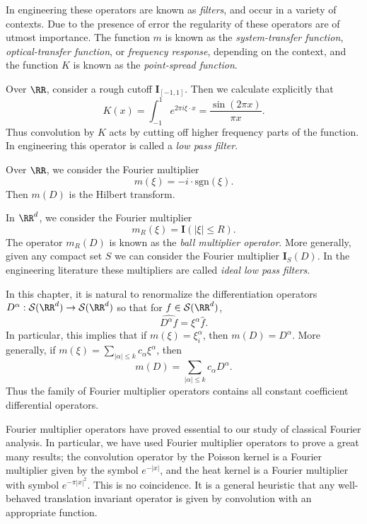 \begin{remark}
  In engineering these operators are known as \emph{filters}, and occur in a variety of contexts. Due to the presence of error the regularity of these operators are of utmost importance. The function $m$ is known as the \emph{system-transfer function}, \emph{optical-transfer function}, or \emph{frequency response}, depending on the context, and the function $K$ is known as the \emph{point-spread function}.
\end{remark}

\begin{example}
  Over $\RR$, consider a rough cutoff $\mathbf{I}_{[-1,1]}$. Then we calculate explicitly that
  \[ K(x) = \int_{-1}^1 e^{2 \pi i \xi \cdot x} = \frac{\sin(2 \pi x)}{\pi x}. \]
  Thus convolution by $K$ acts by cutting off higher frequency parts of the function. In engineering this operator is called a \emph{low pass filter}.
\end{example}

\begin{example}
  Over $\RR$, we consider the Fourier multiplier
  \[ m(\xi) = - i \cdot \text{sgn}(\xi). \]
  Then $m(D)$ is the Hilbert transform.
\end{example}

\begin{example}
  In $\RR^d$, we consider the Fourier multiplier
  \[ m_R(\xi) = \mathbf{I}(|\xi| \leq R). \]
  The operator $m_R(D)$ is known as the \emph{ball multiplier operator}. More generally, given any compact set $S$ we can consider the Fourier multiplier $\mathbf{I}_S(D)$. In the engineering literature these multipliers are called \emph{ideal low pass filters}.
\end{example}

\begin{example}
  In this chapter, it is natural to renormalize the differentiation operators $D^\alpha: \mathcal{S}(\RR^d) \to \mathcal{S}(\RR^d)$ so that for $f \in \mathcal{S}(\RR^d)$,
  \[ \widehat{D^\alpha f} = \xi^\alpha \widehat{f}. \]
  In particular, this implies that if $m(\xi) = \xi_i^\alpha$, then $m(D) = D^\alpha$. More generally, if $m(\xi) = \sum_{|\alpha| \leq k} c_\alpha \xi^\alpha$, then
  \[ m(D) = \sum_{|\alpha| \leq k} c_\alpha D^\alpha. \]
  Thus the family of Fourier multiplier operators contains all constant coefficient differential operators.
\end{example}

Fourier multiplier operators have proved essential to our study of classical Fourier analysis. In particular, we have used Fourier multiplier operators to prove a great many results; the convolution operator by the Poisson kernel is a Fourier multiplier given by the symbol $e^{-|x|}$, and the heat kernel is a Fourier multiplier with symbol $e^{- \pi |x|^2}$. This is no coincidence. It is a general heuristic that any well-behaved translation invariant operator is given by convolution with an appropriate function.

